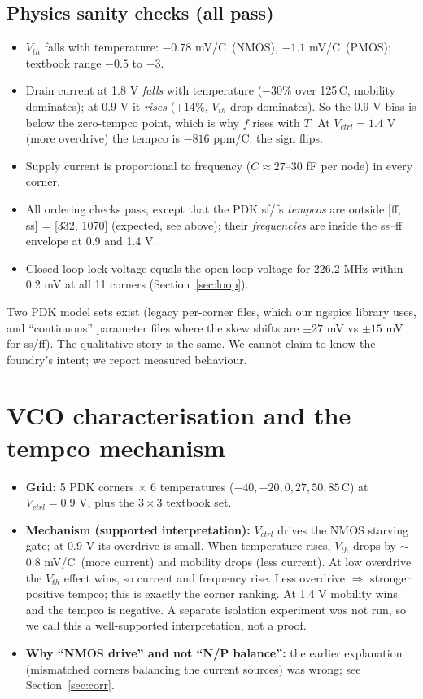 \documentclass[11pt,a4paper]{article}
\newcommand{\degC}{\textdegree C}
\begin{document}
\subsection{Physics sanity checks (all pass)}
\begin{itemize}
\item $V_{th}$ falls with temperature: $-0.78$ mV/\degC\ (NMOS), $-1.1$ mV/\degC\ (PMOS); textbook range $-0.5$ to $-3$.
\item Drain current at 1.8 V \emph{falls} with temperature ($-30\%$ over 125\,\degC, mobility dominates); at 0.9 V it \emph{rises} ($+14\%$, $V_{th}$ drop dominates). So the 0.9 V bias is below the zero-tempco point, which is why $f$ rises with $T$. At $V_{ctrl}=1.4$ V (more overdrive) the tempco is $-816$ ppm/\degC: the sign flips.
\item Supply current is proportional to frequency ($C\approx27$--30 fF per node) in every corner.
\item All ordering checks pass, except that the PDK sf/fs \emph{tempcos} are outside [ff, ss] = [332, 1070] (expected, see above); their \emph{frequencies} are inside the ss--ff envelope at 0.9 and 1.4 V.
\item Closed-loop lock voltage equals the open-loop voltage for 226.2 MHz within 0.2 mV at all 11 corners (Section~\ref{sec:loop}).
\end{itemize}
\begin{careful}
Two PDK model sets exist (legacy per-corner files, which our ngspice library uses, and ``continuous'' parameter files where the skew shifts are $\pm27$ mV vs $\pm15$ mV for ss/ff). The qualitative story is the same. We cannot claim to know the foundry's intent; we report measured behaviour.
\end{careful}

\section{VCO characterisation and the tempco mechanism}
\begin{itemize}
\item \textbf{Grid:} 5 PDK corners $\times$ 6 temperatures ($-40,-20,0,27,50,85$\,\degC) at $V_{ctrl}=0.9$ V, plus the $3\times3$ textbook set.
\item \textbf{Mechanism (supported interpretation):} $V_{ctrl}$ drives the NMOS starving gate; at 0.9 V its overdrive is small. When temperature rises, $V_{th}$ drops by $\sim$0.8 mV/\degC\ (more current) and mobility drops (less current). At low overdrive the $V_{th}$ effect wins, so current and frequency rise. Less overdrive $\Rightarrow$ stronger positive tempco; this is exactly the corner ranking. At 1.4 V mobility wins and the tempco is negative. A separate isolation experiment was not run, so we call this a well-supported interpretation, not a proof.
\item \textbf{Why ``NMOS drive'' and not ``N/P balance'':} the earlier explanation (mismatched corners balancing the current sources) was wrong; see Section~\ref{sec:corr}.
\end{itemize}
\end{document}
